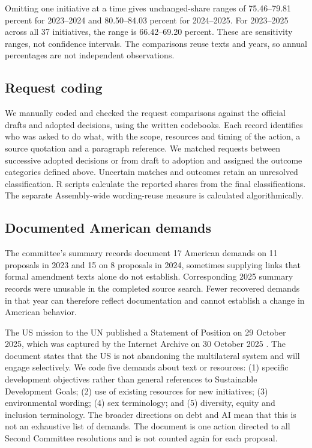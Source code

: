 \documentclass[10pt,authoryear]{elsarticle}
\begin{document}
Omitting one initiative at a time gives unchanged-share ranges of 75.46--79.81 percent for 2023--2024 and 80.50--84.03 percent for 2024--2025. For 2023--2025 across all 37 initiatives, the range is 66.42--69.20 percent. These are sensitivity ranges, not confidence intervals. The comparisons reuse texts and years, so annual percentages are not independent observations.

\subsection{Request coding}
\label{sec:request_coding}

We manually coded and checked the request comparisons against the official drafts and adopted decisions, using the written codebooks. Each record identifies who was asked to do what, with the scope, resources and timing of the action, a source quotation and a paragraph reference. We matched requests between successive adopted decisions or from draft to adoption and assigned the outcome categories defined above. Uncertain matches and outcomes retain an unresolved classification. R scripts calculate the reported shares from the final classifications. The separate Assembly-wide wording-reuse measure is calculated algorithmically.

\subsection{Documented American demands}

The committee's summary records document 17 American demands on 11 proposals in 2023 and 15 on 8 proposals in 2024, sometimes supplying links that formal amendment texts alone do not establish. Corresponding 2025 summary records were unusable in the completed source search. Fewer recovered demands in that year can therefore reflect documentation and cannot establish a change in American behavior.

The US mission to the UN published a Statement of Position on 29 October 2025, which was captured by the Internet Archive on 30 October 2025 \citep{usun:2025:longform}. The document states that the US is not abandoning the multilateral system and will engage selectively. We code five demands about text or resources: (1) specific development objectives rather than general references to Sustainable Development Goals; (2) use of existing resources for new initiatives; (3) environmental wording; (4) sex terminology; and (5) diversity, equity and inclusion terminology. The broader directions on debt and AI mean that this is not an exhaustive list of demands. The document is one action directed to all Second Committee resolutions and is not counted again for each proposal.
\end{document}
